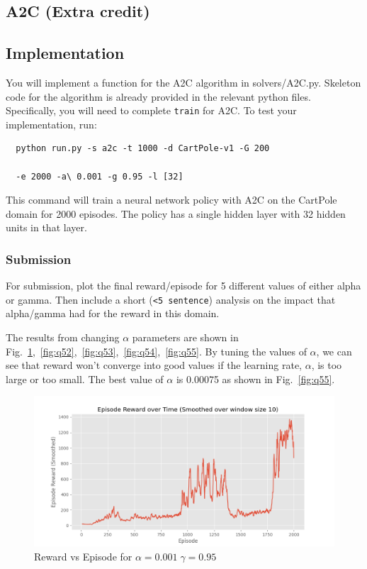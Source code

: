 \documentclass[a4paper]{article}
\theoremstyle{definition}
\newenvironment{soln}{
    \leavevmode\color{blue}\ignorespaces
}{}
\begin{document}
\begin{enumerate}
\section{A2C (Extra credit)}
\subsection{Implementation}

You will implement a function for the A2C algorithm in solvers/A2C.py.
% 
Skeleton code for the algorithm is already provided in the relevant python files.
% 
Specifically, you will need to complete \verb|train| for A2C.
% 
To test your implementation, run:
% 
\begin{verbatim}
  python run.py -s a2c -t 1000 -d CartPole-v1 -G 200 
  
  -e 2000 -a\ 0.001 -g 0.95 -l [32]
\end{verbatim}
% 
This command will train a neural network policy with A2C on the CartPole domain for 2000 episodes.
% 
The policy has a single hidden layer with 32 hidden units in that layer.
\subsubsection*{Submission}
% 

For submission, plot the final reward/episode for 5 different values of either alpha or gamma. Then include a short (\verb|<5 sentence|) analysis on the impact that alpha/gamma had for the reward in this domain.

\begin{soln}
    The results from changing $\alpha$ parameters are shown in Fig.~\ref{fig:q51},~\ref{fig:q52},~\ref{fig:q53},~\ref{fig:q54},~\ref{fig:q55}. By tuning the values of $\alpha$, we can see that reward won't converge into good values if the learning rate, $\alpha$, is too large or too small. The best value of $\alpha$ is 0.00075 as shown in Fig.~\ref{fig:q55}.\\
    \begin{figure}[H]
        \centering
        \includegraphics[width=0.8\linewidth]{5_1_b.png}
        \caption{Reward vs Episode for $\alpha = 0.001 \; \gamma = 0.95$}
        \label{fig:q51}
    \end{figure}


\end{soln}
\end{enumerate}
\end{document}
